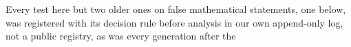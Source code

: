 Every test here but two older ones on false mathematical statements, one
below, was registered with its decision rule before analysis in our own
append-only log, not a public registry, as was every generation after the
